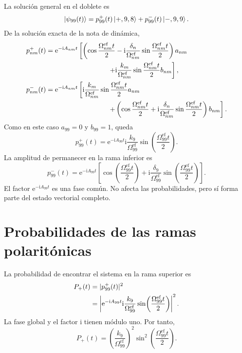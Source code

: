 \documentclass[11pt]{article}
\newcommand{\ii}{\mathrm{i}}
\newcommand{\ee}{\mathrm{e}}
\begin{document}
La soluci\'on general en el doblete es
\begin{equation}
  \ket{\psi_{99}(t)}
  =
  p_{99}^{+}(t)\ket{+,9,8}
  +
  p_{99}^{-}(t)\ket{-,9,9}.
\end{equation}
De la soluci\'on exacta de la nota de din\'amica,
\begin{align}
  p_{nm}^{+}(t)
  &=
  \ee^{-\ii A_{nm}t}
  \left[
  \left(
  \cos\frac{\Omega_{nm}^{\mathrm{ef}}t}{2}
  -
  \ii\frac{\delta_n}{\Omega_{nm}^{\mathrm{ef}}}
  \sin\frac{\Omega_{nm}^{\mathrm{ef}}t}{2}
  \right)a_{nm}
  \right.
  \notag\\
  &\hspace{3.2cm}
  \left.
  +
  \ii\frac{k_m}{\Omega_{nm}^{\mathrm{ef}}}
  \sin\frac{\Omega_{nm}^{\mathrm{ef}}t}{2}
  b_{nm}
  \right],
  \\
  p_{nm}^{-}(t)
  &=
  \ee^{-\ii A_{nm}t}
  \left[
  \ii\frac{k_m}{\Omega_{nm}^{\mathrm{ef}}}
  \sin\frac{\Omega_{nm}^{\mathrm{ef}}t}{2}
  a_{nm}
  \right.
  \notag\\
  &\hspace{3.2cm}
  \left.
  +
  \left(
  \cos\frac{\Omega_{nm}^{\mathrm{ef}}t}{2}
  +
  \ii\frac{\delta_n}{\Omega_{nm}^{\mathrm{ef}}}
  \sin\frac{\Omega_{nm}^{\mathrm{ef}}t}{2}
  \right)b_{nm}
  \right].
\end{align}
Como en este caso $a_{99}=0$ y $b_{99}=1$, queda
\begin{equation}
  \boxed{
  p_{99}^{+}(t)
  =
  \ee^{-\ii A_{99}t}
  \ii\frac{k_9}{\Omega_{99}^{\mathrm{ef}}}
  \sin\!\left(
  \frac{\Omega_{99}^{\mathrm{ef}}t}{2}
  \right).
  }
\end{equation}
La amplitud de permanecer en la rama inferior es
\begin{equation}
  \boxed{
  p_{99}^{-}(t)
  =
  \ee^{-\ii A_{99}t}
  \left[
  \cos\!\left(
  \frac{\Omega_{99}^{\mathrm{ef}}t}{2}
  \right)
  +
  \ii\frac{\delta_9}{\Omega_{99}^{\mathrm{ef}}}
  \sin\!\left(
  \frac{\Omega_{99}^{\mathrm{ef}}t}{2}
  \right)
  \right].
  }
\end{equation}
El factor $\ee^{-\ii A_{99}t}$ es una fase com\'un. No afecta las
probabilidades, pero s\'i forma parte del estado vectorial completo.

\section{Probabilidades de las ramas polarit\'onicas}

La probabilidad de encontrar el sistema en la rama superior es
\begin{align}
  P_+(t)
  &=
  |p_{99}^{+}(t)|^2
  \notag\\
  &=
  \left|
  \ee^{-\ii A_{99}t}
  \ii\frac{k_9}{\Omega_{99}^{\mathrm{ef}}}
  \sin\!\left(
  \frac{\Omega_{99}^{\mathrm{ef}}t}{2}
  \right)
  \right|^2.
\end{align}
La fase global y el factor $\ii$ tienen m\'odulo uno. Por tanto,
\begin{equation}
  \boxed{
  P_+(t)
  =
  \left(
  \frac{k_9}{\Omega_{99}^{\mathrm{ef}}}
  \right)^2
  \sin^2\!\left(
  \frac{\Omega_{99}^{\mathrm{ef}}t}{2}
  \right).
  }
\end{equation}
\end{document}
